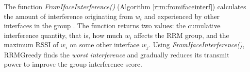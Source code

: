 
The function \textit{FromIfaceInterference()} (Algorithm \ref{rrm:fromifaceinterf}) calculates the amount of interference originating from $w_i$ and experienced by other interfaces in the group \rrmG. The function returns two values: the cumulative interference quantity, that is, how much $w_i$ affects the RRM group, and the maximum RSSI of $w_i$ on some other interface $w_j$. Using \textit{FromIfaceInterference()}, RRMGreedy finds the \textit{worst interference} and gradually reduces its transmit power to improve the group interference score.

\newcommand{\rrmIface}{interface}
\newcommand{\rrmScandata}{scandata}


